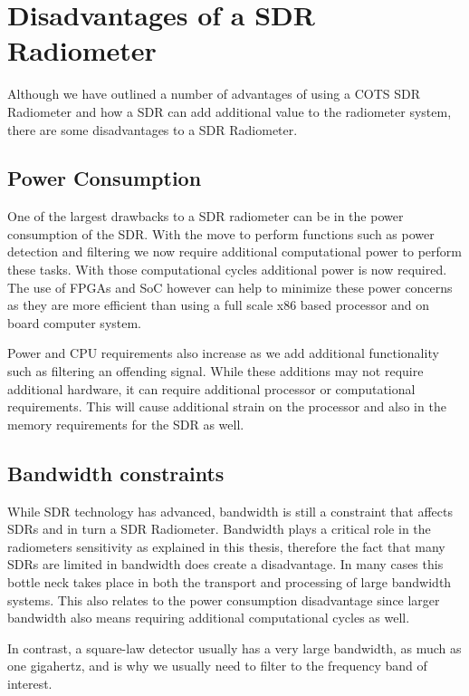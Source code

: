 \section{Disadvantages of a SDR Radiometer}
Although we have outlined a number of advantages of using a COTS SDR Radiometer and how a SDR can add additional value to the radiometer system, there are some disadvantages to a SDR Radiometer.

\subsection{Power Consumption}
One of the largest drawbacks to a SDR radiometer can be in the power consumption of the SDR.  With the move to perform functions such as power detection and filtering we now require additional computational power to perform these tasks.  With those computational cycles additional power is now required.  The use of FPGAs and SoC however can help to minimize these power concerns as they are more efficient than using a full scale x86 based processor and on board computer system.  

Power and CPU requirements also increase as we add additional functionality such as filtering an offending signal.  While these additions may not require additional hardware, it can require additional processor or computational requirements.  This will cause additional strain on the processor and also in the memory requirements for the SDR as well.

\subsection{Bandwidth constraints}
While SDR technology has advanced, bandwidth is still a constraint that affects SDRs and in turn a SDR Radiometer.  Bandwidth plays a critical role in the radiometers sensitivity as explained in this thesis, therefore the fact that many SDRs are limited in bandwidth does create a disadvantage.  In many cases this bottle neck takes place in both the transport and processing of large bandwidth systems.  This also relates to the power consumption disadvantage since larger bandwidth also means requiring additional computational cycles as well.  

In contrast, a square-law detector usually has a very large bandwidth, as much as one gigahertz, and is why we usually need to filter to the frequency band of interest.  